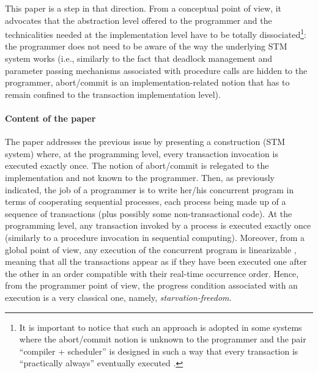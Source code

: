 This paper is a step in that direction.
From a conceptual point of view,  it  advocates that 
the abstraction  level  offered to the programmer and  the technicalities   
needed    at    the    implementation    level    have   to    be   totally
dissociated\footnote{It 
is important to notice that such  an approach is adopted
in some systems where the abort/commit notion is unknown to the programmer
and  the pair ``compiler +  scheduler'' is  designed  in such a way that 
every transaction is ``practically always'' eventually executed  
\cite{F11}.}: the
programmer does not need to be aware of  the way the underlying STM system works
(i.e., similarly to the fact that deadlock management and   parameter 
passing mechanisms  associated with procedure calls are  hidden to the 
programmer, abort/commit   is  an  implementation-related notion  that  
has to remain confined to the transaction implementation level).  



\paragraph{Content of the paper}
The paper addresses the previous issue by presenting a construction  
 (STM system) where, at  the programming level, every  transaction
invocation is  executed  exactly   once. The   notion  of   abort/commit  
is  relegated to the implementation and not known to the programmer. 
Then, as  previously indicated,  the  job  of  a  programmer  is  to   write her/his
concurrent   program in  terms of  cooperating sequential  processes, 
each process  being made up of a sequence of transactions (plus possibly some 
non-transactional  code). At  the  programming level,  any  transaction 
invoked  by  a  process  is  executed  exactly once  (similarly to a
procedure invocation 
in sequential computing). Moreover, from a global point of view, 
any execution of the concurrent program is linearizable \cite{HW90}, meaning 
that all the transactions appear as if they have been executed one after
the other in an order compatible with their real-time occurrence order. 
Hence, from the programmer point of view, the progress condition associated 
with an execution is a very classical one, namely, {\it starvation-freedom}.  

